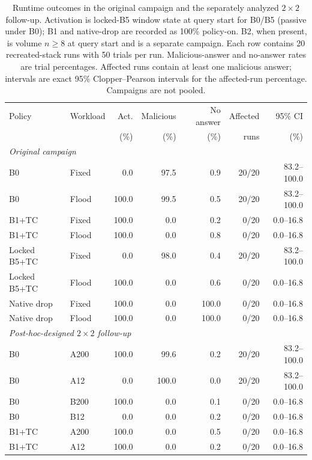 \begin{table}[t]
\centering
\caption{Runtime outcomes in the original campaign and the separately analyzed $2\times2$ follow-up. Activation is locked-B5 window state at query start for B0/B5 (passive under B0); B1 and native-drop are recorded as 100\% policy-on. B2, when present, is volume $n\geq 8$ at query start and is a separate campaign. Each row contains 20 recreated-stack runs with 50 trials per run. Malicious-answer and no-answer rates are trial percentages. Affected runs contain at least one malicious answer; intervals are exact 95\% Clopper--Pearson intervals for the affected-run percentage. Campaigns are not pooled.}
\label{tab:rq4-runtime}
\begingroup
\fontsize{9}{10.8}\selectfont
\setlength{\tabcolsep}{3pt}
\begin{tabular}{llrrrrr}
\hline
Policy & Workload & Act. & Malicious & No answer & Affected & 95\% CI \\
 & & (\%) & (\%) & (\%) & runs & (\%) \\
\hline
\multicolumn{7}{l}{\textit{Original campaign}} \\
\hline
B0 & Fixed & 0.0 & 97.5 & 0.9 & 20/20 & 83.2--100.0 \\
B0 & Flood & 100.0 & 99.5 & 0.5 & 20/20 & 83.2--100.0 \\
B1+TC & Fixed & 100.0 & 0.0 & 0.2 & 0/20 & 0.0--16.8 \\
B1+TC & Flood & 100.0 & 0.0 & 0.8 & 0/20 & 0.0--16.8 \\
Locked B5+TC & Fixed & 0.0 & 98.0 & 0.4 & 20/20 & 83.2--100.0 \\
Locked B5+TC & Flood & 100.0 & 0.0 & 0.6 & 0/20 & 0.0--16.8 \\
Native drop & Fixed & 100.0 & 0.0 & 100.0 & 0/20 & 0.0--16.8 \\
Native drop & Flood & 100.0 & 0.0 & 100.0 & 0/20 & 0.0--16.8 \\
\hline
\multicolumn{7}{l}{\textit{Post-hoc-designed $2\times2$ follow-up}} \\
\hline
B0 & A200 & 100.0 & 99.6 & 0.2 & 20/20 & 83.2--100.0 \\
B0 & A12 & 0.0 & 100.0 & 0.0 & 20/20 & 83.2--100.0 \\
B0 & B200 & 100.0 & 0.0 & 0.1 & 0/20 & 0.0--16.8 \\
B0 & B12 & 0.0 & 0.0 & 0.2 & 0/20 & 0.0--16.8 \\
B1+TC & A200 & 100.0 & 0.0 & 0.5 & 0/20 & 0.0--16.8 \\
B1+TC & A12 & 100.0 & 0.0 & 0.2 & 0/20 & 0.0--16.8 \\

\end{tabular}
\end{table}
